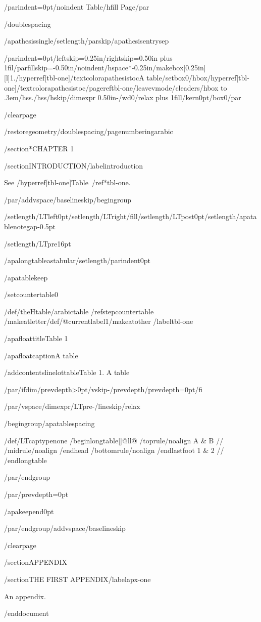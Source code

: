 {/parindent=0pt/noindent Table/hfill Page/par}

/doublespacing

{/apathesissingle/setlength{/parskip}{/apathesisentrysep}

{/parindent=0pt/leftskip=0.25in/rightskip=0.50in plus 1fil/parfillskip=-0.50in/noindent/hspace*{-0.25in}/makebox[0.25in][l]{1.}/hyperref[tbl-one]{/textcolor{apathesistoc}{A table}}/setbox0/hbox{/hyperref[tbl-one]{/textcolor{apathesistoc}{/pageref{tbl-one}}}}/leavevmode/cleaders/hbox to .3em{/hss./hss}/hskip/dimexpr 0.50in-/wd0/relax plus 1fill/kern0pt/box0/par}

}

/clearpage

/restoregeometry/doublespacing/pagenumbering{arabic}

/section*{CHAPTER 1}

/section{INTRODUCTION}/label{introduction}

See /hyperref[tbl-one]{Table~/ref*{tbl-one}}.

/par/addvspace{/baselineskip}/begingroup

/setlength{/LTleft}{0pt}/setlength{/LTright}{/fill}/setlength{/LTpost}{0pt}/setlength{/apatablenotegap}{-0.5pt}

/setlength{/LTpre}{16pt}

/apalongtableastabular/setlength{/parindent}{0pt}

/apatablekeep

/setcounter{table}{0}

/def/theHtable{/arabic{table}}%
/refstepcounter{table}%
/makeatletter/def/@currentlabel{1}/makeatother%
/label{tbl-one}

/apafloattitle{Table 1}

/apafloatcaption{A table}

/addcontentsline{lot}{table}{Table 1. A table}

/par/ifdim/prevdepth>0pt/vskip-/prevdepth/prevdepth=0pt/fi

/par/vspace{/dimexpr/LTpre-/lineskip/relax}

/begingroup/apatablespacing

{/def/LTcaptype{none} %
/begin{longtable}[]{@{}ll@{}}
/toprule/noalign{}
A & B //
/midrule/noalign{}
/endhead
/bottomrule/noalign{}
/endlastfoot
1 & 2 //
/end{longtable}
}

/par/endgroup

/par/prevdepth=0pt

/apakeepend{0pt}

/par/endgroup/addvspace{/baselineskip}

/clearpage

/section{APPENDIX}

/section{THE FIRST APPENDIX}/label{apx-one}

An appendix.




/end{document}
